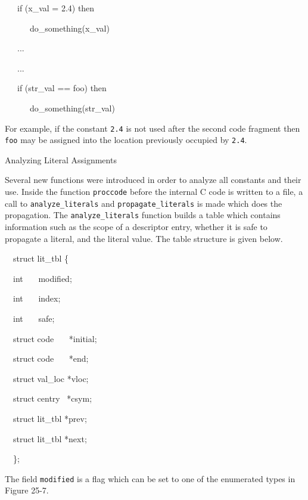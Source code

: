 {\ttfamily\mdseries
\ \ \ if (x\_val = 2.4) then}

{\ttfamily\mdseries
\ \ \ \ \ \ do\_something(x\_val)}

{\ttfamily\mdseries
\ \ \ ...}

{\ttfamily\mdseries
\ \ \ ...}

{\ttfamily\mdseries
\ \ \ if (str\_val == {\textquotedbl}foo{\textquotedbl}) then}

{\ttfamily\mdseries
\ \ \ \ \ \ do\_something(str\_val)}


For example, if the constant \texttt{2.4} is not used after the second
code fragment then \texttt{{\textquotedbl}foo{\textquotedbl}} may be
assigned into the location previously occupied by \texttt{2.4}.

{\sffamily
Analyzing Literal Assignments}


Several new functions were introduced in order to analyze all
constants and their use. Inside the function \texttt{proccode} before
the internal C code is written to a file, a call to
\texttt{analyze\_literals} and \texttt{propagate\_literals} is made
which does the propagation. The \texttt{analyze\_literals} function
builds a table which contains information such as the scope of a
descriptor entry, whether it is safe to propagate a literal, and the
literal value. The table structure is given below.

{\ttfamily\mdseries
\ \ struct lit\_tbl \{}

{\ttfamily\mdseries
\ \ int \ \ \ modified;}

{\ttfamily\mdseries
\ \ int \ \ \ index;}

{\ttfamily\mdseries
\ \ int \ \ \ safe;}

{\ttfamily\mdseries
\ \ struct code \ \ \ *initial;}

{\ttfamily\mdseries
\ \ struct code \ \ \ *end;}

{\ttfamily\mdseries
\ \ struct val\_loc *vloc;}

{\ttfamily\mdseries
\ \ struct centry \ *csym;}

{\ttfamily\mdseries
\ \ struct lit\_tbl *prev;}

{\ttfamily\mdseries
\ \ struct lit\_tbl *next;}

{\ttfamily\mdseries
\ \ \};}


The field \texttt{modified} is a flag which can be set to one of the
enumerated types in Figure 25-7.

